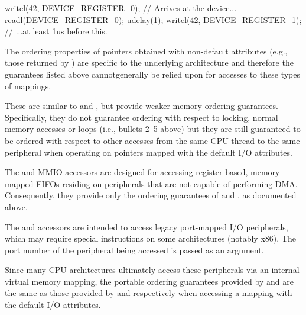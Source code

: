 \begin{description}[style=nextline]
\begin{enumerate}
\begin{VerbatimU}[tabsize=1]
		writel(42, DEVICE_REGISTER_0); // Arrives at the device...
		readl(DEVICE_REGISTER_0);
		udelay(1);
		writel(42, DEVICE_REGISTER_1); // ...at least 1us before this.
\end{VerbatimU}
	\end{enumerate}

	The ordering properties of  pointers obtained with
	non-default attributes (e.g., those returned by )
	are specific to the underlying architecture and therefore the
	guarantees listed above cannotgenerally be relied upon for accesses
	to these types of mappings.

 \item[\tco{readX_relaxed()}, \tco{writeX_relaxed()}:]

	These are similar to  and , but provide
	weaker memory ordering guarantees.
	Specifically, they do not guarantee ordering with respect to locking,
	normal memory accesses or  loops (i.e.,
	bullets 2--5 above) but they are still guaranteed to be ordered with
	respect to other accesses from the same CPU thread to the same
	peripheral when operating on  pointers mapped with the
        default I/O attributes.

 \item[\tco{readsX()}, \tco{writesX()}:]

	The  and  MMIO accessors are designed for
	accessing register-based, memory-mapped FIFOs residing on peripherals
	that are not capable of performing DMA\@.
	Consequently, they provide only the ordering guarantees of
	 and , as documented above.

 \item[\tco{inX()}, \tco{outX()}:]

	The  and  accessors are intended to access legacy
	port-mapped I/O peripherals, which may require special instructions
	on some architectures (notably x86).
	The port number of the peripheral being accessed is passed as an
	argument.

	Since many CPU architectures ultimately access these peripherals via an
	internal virtual memory mapping, the portable ordering guarantees
	provided by  and  are the same as those provided
	by  and  respectively when accessing a
	mapping with the default I/O attributes.


\end{description}
